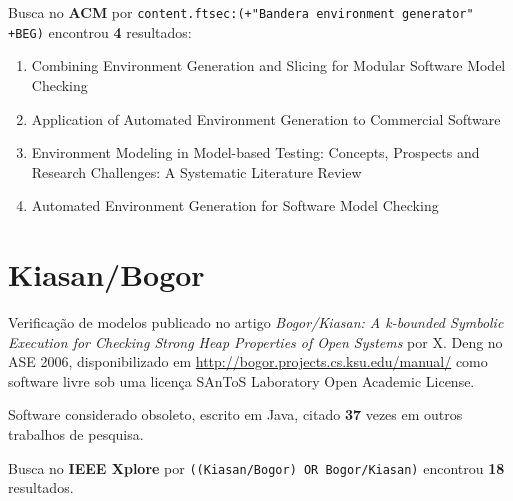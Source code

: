 Busca no {\bf ACM} por
\texttt{content.ftsec:(+"Bandera environment generator" +BEG)}
encontrou {\bf 4}
resultados:

\begin{enumerate}
\item Combining Environment Generation and Slicing for Modular Software Model Checking
\item Application of Automated Environment Generation to Commercial Software
\item Environment Modeling in Model-based Testing: Concepts, Prospects and Research Challenges: A Systematic Literature Review
\item Automated Environment Generation for Software Model Checking
\end{enumerate}

\section{Kiasan/Bogor}

Verificação de modelos
publicado no artigo {\it Bogor/Kiasan: A k-bounded Symbolic Execution for Checking Strong Heap Properties of Open Systems}
por X. Deng
no ASE 2006,
disponibilizado em \url{http://bogor.projects.cs.ksu.edu/manual/}
como software livre
sob uma licença SAnToS Laboratory Open Academic License.

Software considerado obsoleto,
escrito em Java,
citado {\bf 37} vezes em outros trabalhos de pesquisa.

Busca no {\bf IEEE Xplore} por
\texttt{((Kiasan/Bogor) OR Bogor/Kiasan)}
encontrou {\bf 18}
resultados.

